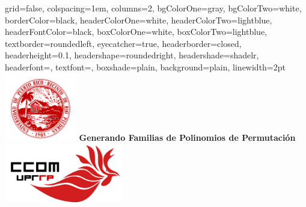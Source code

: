 \documentclass[landscape,final,paperwidth=24in,paperheight=36in]{baposter}
\begin{document}
\begin{poster}%
  {
  grid=false,
  colspacing=1em,
  columns=2,
  bgColorOne=gray,
  bgColorTwo=white,
  borderColor=black,
  headerColorOne=white,
  headerColorTwo=lightblue,
  headerFontColor=black,
  boxColorOne=white,
  boxColorTwo=lightblue,
  textborder=roundedleft,
  eyecatcher=true,
  headerborder=closed,
  headerheight=0.1\textheight,
  headershape=roundedright,
  headershade=shadelr,
  headerfont=\textsc, %
  textfont=\scriptsize{\setlength{\parindent}{1.5em}},
  boxshade=plain,
  background=plain,
  linewidth=2pt
  }
  {\includegraphics[height=8em,keepaspectratio=true]{images/logo_uprrp}} 
  {\bf {\LARGE Generando Familias de Polinomios de Permutaci\'on}}
  {}
  {%
    \includegraphics[height=7em,keepaspectratio=true]{gallo}
  }

    \newcommand{\colouredcircle}{%
      \tikz{\useasboundingbox (-0.2em,-0.32em) rectangle(0.2em,0.32em); \draw[draw=black,fill=lightblue,line width=0.03em] (0,0) circle(0.18em);}}



\end{poster}
\end{document}
